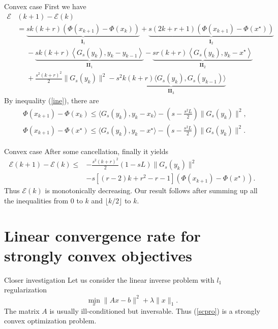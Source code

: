 \documentclass[10pt]{beamer}
\begin{document}
\begin{frame}{Convex case}
  First we have
  \begin{align*}
    \mathcal{E}&(k+1) - \mathcal{E}(k) \\
    & =   \underbrace{sk(k+r)\left( \Phi(x_{k+1}) - \Phi(x_{k}) \right) }_{\mathbf{I}_1}+ \underbrace{s(2k+r+1)\left( \Phi(x_{k+1}) - \Phi(x^\star) \right)}_{\mathbf{I}_2}  \\
    & \mathrel{\phantom{=}} - \underbrace{sk(k+r)\left\langle G_s(y_{k}), y_{k} - y_{k-1} \right\rangle }_{\mathbf{II}_1}- \underbrace{sr(k+r)\left\langle G_s(y_{k}),  y_{k} - x^\star\right\rangle}_{\mathbf{II}_2}  \\
    & \mathrel{\phantom{=}} + \frac{s^2(k+r)^2}{2}\big\| G_s(y_{k}) \big\|^2 - \underbrace{s^{2}k(k+r)\langle G_s(y_{k}), G_s(y_{k-1}) \rangle}_{\mathbf{II}_3}
  \end{align*}
  \pause
  By inequality (\ref{ine}), there are 
  \begin{align}
    &\Phi(x_{k+1}) - \Phi(x_k) \le \langle G_s(y_k), y_k - x_k\rangle - \left(s - \frac{s^2 L}{2}\right)\|G_s(y_k)\|^2, \label{eqn: key-1-inq} \\
    &\Phi(x_{k+1}) - \Phi(x^\star) \le \langle G_s(y_k), y_k - x^\star\rangle - \left(s - \frac{s^2 L}{2}\right)\|G_s(y_k)\|^2. \label{eqn: key-2-inq}
\end{align}
\end{frame}

\begin{frame}{Convex case}
  After some cancellation, finally it yields
  \begin{align}
    \mathcal{E}(k+1) - \mathcal{E}(k) \leq & - \frac{s^2(k+r)^2}{2}\left(1- sL\right)\|G_s(y_k)\|^2 \nonumber \\
    & - s \left[ (r-2)k + r^2 - r - 1  \right]\left( \Phi(x_{k+1}) - \Phi(x^\star) \right). 
  \label{eqn: final-iterative}   
  \end{align}
  Thus $\mathcal{E}(k)$ is monotonically decreasing. Our result follows after summing up all the inequalities from $0$ to $k$ and $\lfloor k/2 \rfloor$ to $k$.
\end{frame}


\section{Linear convergence rate for strongly convex objectives}
\begin{frame}{Closer investigation}
  Let us consider the linear inverse problem with $l_1$ regularization 
  \begin{equation}\label{scpro}
    \min_x \|Ax - b\|^2 + \lambda\|x\|_1.
  \end{equation}
  The matrix $A$ is usually ill-conditioned but inversable. Thus (\ref{scpro}) is a strongly convex optimization problem.
\end{frame}
\end{document}
